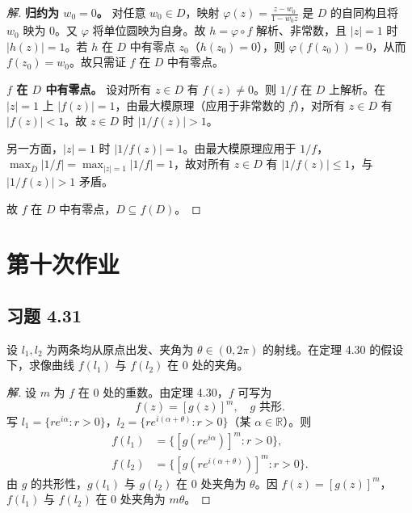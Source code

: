 \documentclass[11pt,a4paper]{article}
\newcommand{\R}{\mathbb{R}}
\theoremstyle{definition}
\newenvironment{solution}{\begin{proof}[解]}{\end{proof}}
\begin{document}
\begin{solution}
  \textbf{归约为 $w_0 = 0$。}
  对任意 $w_0 \in D$，映射 $\varphi(z) = \frac{z - w_0}{1 - \overline{w_0}z}$ 是 $D$ 的自同构且将 $w_0$ 映为 $0$。又 $\varphi$ 将单位圆映为自身。故 $h = \varphi \circ f$ 解析、非常数，且 $|z| = 1$ 时 $|h(z)| = 1$。若 $h$ 在 $D$ 中有零点 $z_0$（$h(z_0) = 0$），则 $\varphi(f(z_0)) = 0$，从而 $f(z_0) = w_0$。故只需证 $f$ 在 $D$ 中有零点。

  \medskip
  \textbf{$f$ 在 $D$ 中有零点。}
  设对所有 $z \in D$ 有 $f(z) \ne 0$。则 $1/f$ 在 $D$ 上解析。在 $|z| = 1$ 上 $|f(z)| = 1$，由最大模原理（应用于非常数的 $f$），对所有 $z \in D$ 有 $|f(z)| < 1$。故 $z \in D$ 时 $|1/f(z)| > 1$。

  另一方面，$|z| = 1$ 时 $|1/f(z)| = 1$。由最大模原理应用于 $1/f$，$\max_{\overline{D}} |1/f| = \max_{|z|=1} |1/f| = 1$，故对所有 $z \in D$ 有 $|1/f(z)| \le 1$，与 $|1/f(z)| > 1$ 矛盾。

  故 $f$ 在 $D$ 中有零点，$D \subseteq f(D)$。
\end{solution}

\section{第十次作业}

\subsection{习题 4.31}

设 $l_1, l_2$ 为两条均从原点出发、夹角为 $\theta \in (0, 2\pi)$ 的射线。在定理 4.30 的假设下，求像曲线 $f(l_1)$ 与 $f(l_2)$ 在 $0$ 处的夹角。

\begin{solution}
  设 $m$ 为 $f$ 在 $0$ 处的重数。由定理 4.30，$f$ 可写为
  \[
    f(z) = [g(z)]^m,\quad g \text{ 共形}.
  \]
  写 $l_1 = \{re^{i\alpha} : r > 0\}$，$l_2 = \{re^{i(\alpha + \theta)} : r > 0\}$（某 $\alpha \in \R$）。则
  \[
    \begin{aligned}
      f(l_1) &= \{[g(re^{i\alpha})]^m : r > 0\}, \\
      f(l_2) &= \{[g(re^{i(\alpha + \theta)})]^m : r > 0\}.
    \end{aligned}
  \]
  由 $g$ 的共形性，$g(l_1)$ 与 $g(l_2)$ 在 $0$ 处夹角为 $\theta$。因 $f(z) = [g(z)]^m$，$f(l_1)$ 与 $f(l_2)$ 在 $0$ 处夹角为 $m\theta$。
\end{solution}
\end{document}
